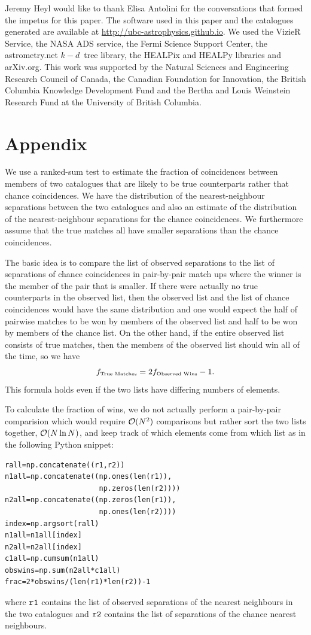 \documentclass[useAMS,usenatbib]{mn2e}
\begin{document}
Jeremy Heyl would like to thank Elisa Antolini for the conversations
that formed the impetus for this paper.  The software used in this
paper and the catalogues generated are available at
\url{http://ubc-astrophysics.github.io}.  We used the VizieR Service,
the NASA ADS service, the Fermi Science Support Center, the
astrometry.net $k-d$~tree library, the HEALPix and HEALPy libraries
and arXiv.org. This work was supported by the Natural Sciences and
Engineering Research Council of Canada, the Canadian Foundation for
Innovation, the British Columbia Knowledge Development Fund and the
Bertha and Louis Weinstein Research Fund at the University of British
Columbia.




\section*{Appendix}

We use a ranked-sum test to estimate the fraction of coincidences
between members of two catalogues that are likely to be true
counterparts rather that chance coincidences.  We have the
distribution of the nearest-neighbour separations between the two
catalogues and also an estimate of the distribution of the
nearest-neighbour separations for the chance coincidences.  We
furthermore assume that the true matches all have smaller separations
than the chance coincidences.

The basic idea is to compare the list of observed separations to the
list of separations of chance coincidences in pair-by-pair match ups
where the winner is the member of the pair that is smaller.  If there
were actually no true counterparts in the observed list, then the
observed list and the list of chance coincidences would have the same
distribution and one would expect the half of pairwise matches to be
won by members of the observed list and half to be won by members of
the chance list.  On the other hand, if the entire observed list
consists of true matches, then the members of the observed list should
win all of the time, so we have
$$
f_\textrm{\scriptsize True Matches} = 2 f_\textrm{\scriptsize Observed Wins} - 1.
$$
This formula holds even if the two lists have differing numbers of
elements.

To calculate the fraction of wins, we do not actually perform a pair-by-pair
comparision which would require ${\cal O}(N^2)$ comparisons but rather sort the
two lists together, ${\cal O}(N \ln N)$, and keep track of which elements
come from which list as in the following Python snippet:
\begin{verbatim}
rall=np.concatenate((r1,r2))
n1all=np.concatenate((np.ones(len(r1)),
                      np.zeros(len(r2))))
n2all=np.concatenate((np.zeros(len(r1)),
                      np.ones(len(r2))))
index=np.argsort(rall)
n1all=n1all[index]
n2all=n2all[index]
c1all=np.cumsum(n1all)
obswins=np.sum(n2all*c1all)
frac=2*obswins/(len(r1)*len(r2))-1
\end{verbatim}
where ${\tt r1}$ contains the list of observed separations of the
nearest neighbours in the two catalogues and ${\tt r2}$ contains the
list of separations of the chance nearest neighbours.
    
\label{lastpage}
\end{document}

